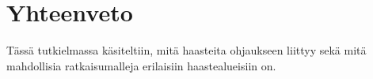 \chapter{Yhteenveto\label{conclusions}}

Tässä tutkielmassa käsiteltiin, mitä haasteita ohjaukseen liittyy sekä mitä mahdollisia ratkaisumalleja erilaisiin haastealueisiin on.